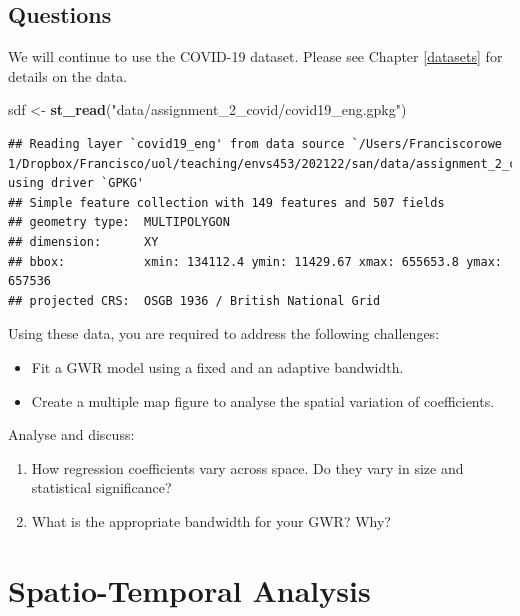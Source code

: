 \documentclass[
]{book}
\newenvironment{Shaded}{\begin{snugshade}}{\end{snugshade}}
\newcommand{\KeywordTok}[1]{\textcolor[rgb]{0.13,0.29,0.53}{\textbf{#1}}}
\newcommand{\NormalTok}[1]{#1}
\newcommand{\StringTok}[1]{\textcolor[rgb]{0.31,0.60,0.02}{#1}}
\providecommand{\tightlist}{%
  \setlength{\itemsep}{0pt}\setlength{\parskip}{0pt}}
\begin{document}
\hypertarget{questions-5}{%
\section{Questions}\label{questions-5}}

We will continue to use the COVID-19 dataset. Please see Chapter \ref{datasets} for details on the data.

\begin{Shaded}
\begin{Highlighting}[]
\NormalTok{sdf <-}\StringTok{ }\KeywordTok{st_read}\NormalTok{(}\StringTok{"data/assignment_2_covid/covid19_eng.gpkg"}\NormalTok{)}
\end{Highlighting}
\end{Shaded}

\begin{verbatim}
## Reading layer `covid19_eng' from data source `/Users/Franciscorowe 1/Dropbox/Francisco/uol/teaching/envs453/202122/san/data/assignment_2_covid/covid19_eng.gpkg' using driver `GPKG'
## Simple feature collection with 149 features and 507 fields
## geometry type:  MULTIPOLYGON
## dimension:      XY
## bbox:           xmin: 134112.4 ymin: 11429.67 xmax: 655653.8 ymax: 657536
## projected CRS:  OSGB 1936 / British National Grid
\end{verbatim}

Using these data, you are required to address the following challenges:

\begin{itemize}
\item
  Fit a GWR model using a fixed and an adaptive bandwidth.
\item
  Create a multiple map figure to analyse the spatial variation of coefficients.
\end{itemize}

Analyse and discuss:

\begin{enumerate}
\def\labelenumi{\arabic{enumi}.}
\tightlist
\item
  How regression coefficients vary across space. Do they vary in size and statistical significance?
\item
  What is the appropriate bandwidth for your GWR? Why?
\end{enumerate}

\hypertarget{sta}{%
\chapter{Spatio-Temporal Analysis}\label{sta}}
\end{document}
